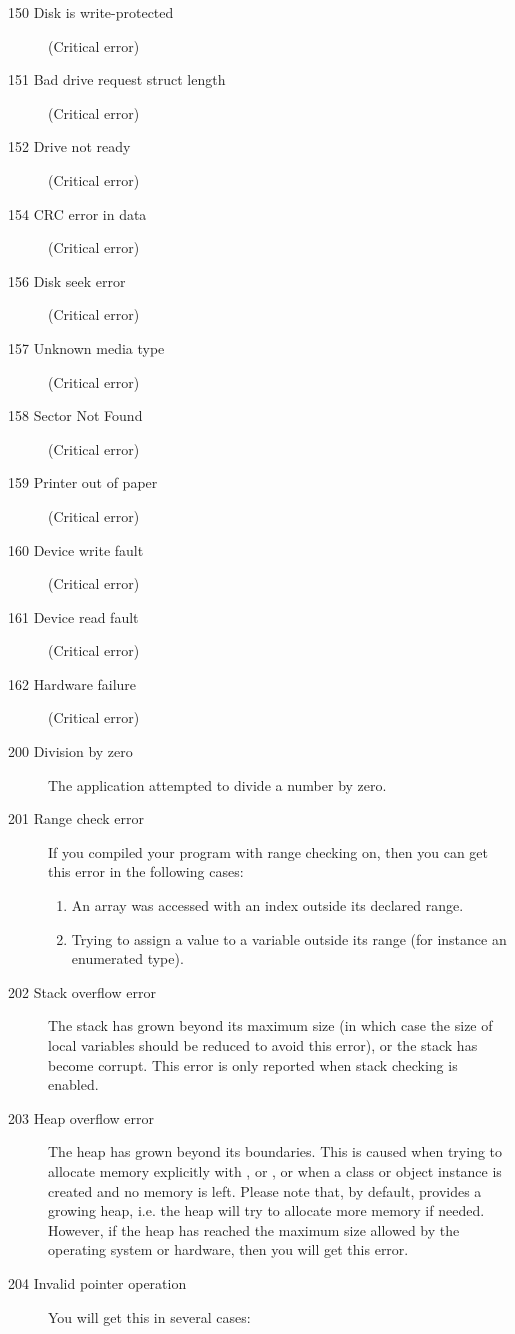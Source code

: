 \begin{description}
\item [150  Disk is write-protected]
(Critical error)
\item [151  Bad drive request struct length]
(Critical error)
\item [152  Drive not ready]
(Critical error)
\item [154  CRC error in data]
(Critical error)
\item [156  Disk seek error]
(Critical error)
\item [157  Unknown media type]
(Critical error)
\item [158  Sector Not Found]
(Critical error)
\item [159  Printer out of paper]
(Critical error)
\item [160  Device write fault]
(Critical error)
\item [161  Device read fault]
(Critical error)
\item [162  Hardware failure]
(Critical error)
\item [200  Division by zero]
The application attempted to divide a number by zero.
\item [201  Range check error]
If you compiled your program with range checking on, then you can get this
error in the following cases:
\begin{enumerate}
\item An array was accessed with an index outside its declared range.
\item Trying to assign a value to a variable outside its range (for
instance an enumerated type).
\end{enumerate}
\item [202  Stack overflow error]
The stack has grown beyond its maximum size (in which case the size of 
local variables should be reduced to avoid this error), or the stack has 
become corrupt. This error is only reported when stack checking is enabled.
\item [203  Heap overflow error]
The heap has grown beyond its boundaries. This is caused when trying to allocate
memory explicitly with ,  or , or when
a class or object instance is created and no memory is left. Please note 
that, by default, \fpc provides a growing heap, i.e. the heap will
try to allocate more memory if needed. However, if the heap has reached the
maximum size allowed by the operating system or hardware, then you will get
this error.
\item [204  Invalid pointer operation]
You will get this in several cases:
\begin{itemize}

\end{itemize}
\end{description}
